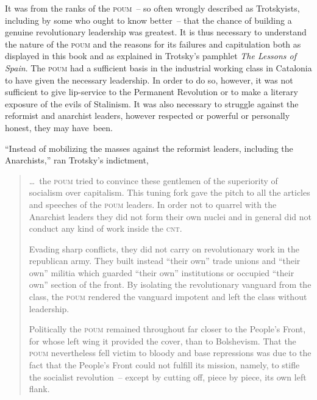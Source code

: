 It was from the ranks of the \textsc{poum}~-- so often wrongly described as Trotskyists, including by some who ought to know better~-- that the chance of building a genuine revolutionary leadership was greatest. It is thus necessary to understand the nature of the \textsc{poum} and the reasons for its failures and capitulation both as displayed in this book and as explained in Trotsky’s pamphlet \emph{The Lessons of Spain}. The \textsc{poum} had a sufficient basis in the industrial working class in Catalonia to have given the necessary leadership. In order to do so, however, it was not sufficient to give lip-service to the Permanent Revolution or to make a literary exposure of the evils of Stalinism. It was also necessary to struggle against the reformist and anarchist leaders, however respected or powerful or personally honest, they may have~been.

``Instead of mobilizing the masses against the reformist leaders, including the Anarchists,'' ran Trotsky’s indictment,

\begin{quotation}
  \noindent
  \dots\ the \textsc{poum} tried to convince these gentlemen of the superiority of socialism over capitalism. This tuning fork gave the pitch to all the articles and speeches of the \textsc{poum} leaders. In order not to quarrel with the Anarchist leaders they did not form their own nuclei and in general did not conduct any kind of work inside the \textsc{cnt}.
  
  Evading sharp conflicts, they did not carry on revolutionary work in the republican army. They built instead ``their own'' trade unions and ``their own'' militia which guarded ``their own'' institutions or occupied ``their own'' section of the front. By isolating the revolutionary vanguard from the class, the \textsc{poum} rendered the vanguard impotent and left the class without leadership.
  
  Politically the \textsc{poum} remained throughout far closer to the People’s Front, for whose left wing it provided the cover, than to Bolshevism. That the \textsc{poum} nevertheless fell victim to bloody and base repressions was due to the fact that the People’s Front could not fulfill its mission, namely, to stifle the socialist revolution~-- except by cutting off, piece by piece, its own left flank.
\end{quotation}

